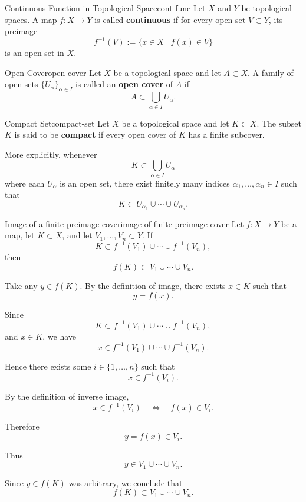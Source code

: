 \documentclass[UTF8,12pt,a4paper]{ctexart}
\makeatletter
\numberwithin{equation}{section}
\newcommand{\currentProofColor}{black}
\renewenvironment{proof}[1][Proof]{%
  \par
  \begingroup
  \edef\proofQEDColor{\currentProofColor}%
  \renewcommand{\qedsymbol}{\textcolor{\proofQEDColor}{$\blacksquare$}}%
  \pushQED{\qed}%
  \normalfont
  \topsep6\p@\@plus6\p@\relax
  \trivlist
  \item[\hskip\labelsep\bfseries\itshape #1\@addpunct{.}]\ignorespaces
}{%
  \popQED
  \endtrivlist
  \@endpefalse
  \endgroup
}
\makeatother
\begin{document}
\begin{defi}{Continuous Function in Topological Space}{cont-func}
Let $X$ and $Y$ be topological spaces. A map $f: X \to Y$ is called \textbf{continuous} if for every open set $V \subset Y$, its preimage
$$
f^{-1}(V) := \{x \in X \mid f(x) \in V\}
$$
is an open set in $X$.
\end{defi}

\begin{defi}{Open Cover}{open-cover}
Let $X$ be a topological space and let $A \subset X$. A family of open sets $\{U_\alpha\}_{\alpha \in I}$ is called an \textbf{open cover} of $A$ if 
$$
A \subset \bigcup_{\alpha \in I} U_\alpha.
$$
\end{defi}

\begin{defi}{Compact Set}{compact-set}
Let $X$ be a topological space and let $K \subset X$. The subset $K$ is said to be \textbf{compact} if every open cover of $K$ has a finite subcover. 

More explicitly, whenever 
$$
K \subset \bigcup_{\alpha \in I} U_\alpha
$$
where each $U_\alpha$ is an open set, there exist finitely many indices $\alpha_1, \dots, \alpha_n \in I$ such that
$$
K \subset U_{\alpha_1} \cup \cdots \cup U_{\alpha_n}.
$$
\end{defi}

\begin{lem}{Image of a finite preimage cover}{image-of-finite-preimage-cover}
Let \(f:X\to Y\) be a map, let \(K\subset X\), and let
\(V_1,\dots,V_n\subset Y\). If
$$
K\subset f^{-1}(V_1)\cup\cdots\cup f^{-1}(V_n),
$$
then
$$
f(K)\subset V_1\cup\cdots\cup V_n.
$$
\end{lem}

\begin{proof}
Take any \(y\in f(K)\). By the definition of image, there exists
\(x\in K\) such that
$$
y=f(x).
$$

Since
$$
K\subset f^{-1}(V_1)\cup\cdots\cup f^{-1}(V_n),
$$
and \(x\in K\), we have
$$
x\in f^{-1}(V_1)\cup\cdots\cup f^{-1}(V_n).
$$

Hence there exists some \(i\in\{1,\dots,n\}\) such that
$$
x\in f^{-1}(V_i).
$$

By the definition of inverse image,
$$
x\in f^{-1}(V_i)
\quad\Longleftrightarrow\quad
f(x)\in V_i.
$$

Therefore
$$
y=f(x)\in V_i.
$$

Thus
$$
y\in V_1\cup\cdots\cup V_n.
$$

Since \(y\in f(K)\) was arbitrary, we conclude that
$$
f(K)\subset V_1\cup\cdots\cup V_n.
$$
\end{proof}
\end{document}
